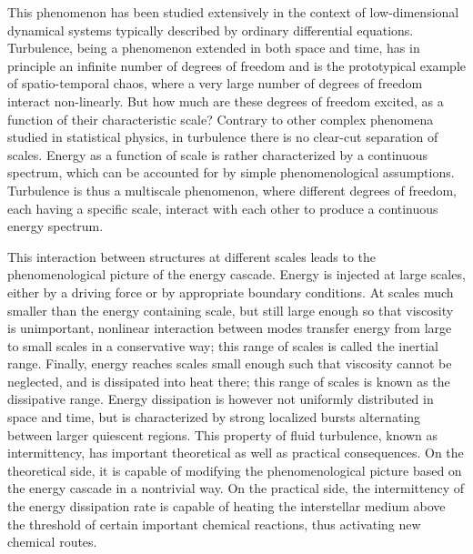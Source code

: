 This phenomenon has been studied extensively in the context of low-dimensional dynamical systems typically described by ordinary differential equations. Turbulence, being a phenomenon extended in both space and time, has in principle an infinite number of degrees of freedom and is the prototypical example of spatio-temporal chaos, where a very large number of degrees of freedom interact non-linearly.
But how much are these degrees of freedom excited, as a function of their characteristic scale? Contrary to other complex phenomena studied in statistical physics, in turbulence there is no clear-cut separation
of scales. Energy as a function of scale is rather characterized by a continuous spectrum, which can be accounted for by simple phenomenological assumptions. Turbulence is thus a multiscale phenomenon, where different degrees of freedom, each having a specific scale, interact with each other to produce a continuous
energy spectrum. 

This interaction between structures at different scales leads to the phenomenological picture of the energy cascade. Energy is injected at large scales, either by a driving force or by appropriate boundary conditions. At
scales much smaller than the energy containing scale, but still large enough so that viscosity is unimportant, nonlinear interaction between modes transfer energy from large to small scales in a conservative way; this range of scales is called the inertial range. Finally, energy reaches scales small enough such that viscosity cannot be neglected, and is dissipated into heat there; this range of scales is known as the dissipative range.
Energy dissipation is however not uniformly distributed in space and time, but is characterized by strong localized bursts alternating between larger quiescent regions. This property of fluid turbulence, known as intermittency, has important theoretical as well as practical consequences. On the theoretical side, it is capable of modifying the phenomenological picture based on the energy cascade in a nontrivial way. On the practical side, the intermittency of the energy dissipation rate is capable of heating the interstellar medium
above the threshold of certain important chemical reactions, thus activating new chemical routes.

